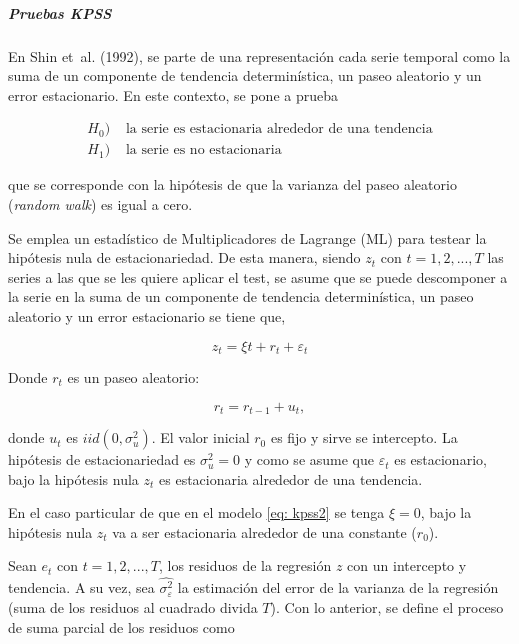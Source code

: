 \documentclass[
  oneside]{article}
\begin{document}
\newpage

\hypertarget{pruebas-kpss}{%
\subparagraph{Pruebas KPSS}\label{pruebas-kpss}}

En Shin et~al. (1992), se parte de una representación cada serie
temporal como la suma de un componente de tendencia determinística, un
paseo aleatorio y un error estacionario. En este contexto, se pone a
prueba

\begin{align*}
    H_0)&\text{ la serie es estacionaria alrededor de una tendencia}    \\
    H_1)&\text{ la serie es no estacionaria}
\end{align*}

que se corresponde con la hipótesis de que la varianza del paseo
aleatorio (\textit{random walk}) es igual a cero.

Se emplea un estadístico de Multiplicadores de Lagrange (ML) para
testear la hipótesis nula de estacionariedad. De esta manera, siendo
\(z_t\) con \(t=1,2,...,T\) las series a las que se les quiere aplicar
el test, se asume que se puede descomponer a la serie en la suma de un
componente de tendencia determinística, un paseo aleatorio y un error
estacionario se tiene que,

\begin{equation}
    \label{eq: kpss2}    
    z_t=\xi t + r_t + \varepsilon_t
\end{equation}

Donde \(r_t\) es un paseo aleatorio:

\begin{equation}
    \label{eq: kpss3}    
    r_t = r_{t-1} + u_t,
\end{equation}

donde \(u_t\) es \(iid(0,\sigma_u^2)\). El valor inicial \(r_0\) es fijo
y sirve se intercepto. La hipótesis de estacionariedad es
\(\sigma_u^2=0\) y como se asume que \(\varepsilon_t\) es estacionario,
bajo la hipótesis nula \(z_t\) es estacionaria alrededor de una
tendencia.

En el caso particular de que en el modelo \eqref{eq: kpss2} se tenga
\(\xi=0\), bajo la hipótesis nula \(z_t\) va a ser estacionaria
alrededor de una constante (\(r_0\)).

Sean \(e_t\) con \(t=1,2,...,T\), los residuos de la regresión \(z\) con
un intercepto y tendencia. A su vez, sea \(\hat{\sigma_\varepsilon^2}\)
la estimación del error de la varianza de la regresión (suma de los
residuos al cuadrado divida \(T\)). Con lo anterior, se define el
proceso de suma parcial de los residuos como
\end{document}
